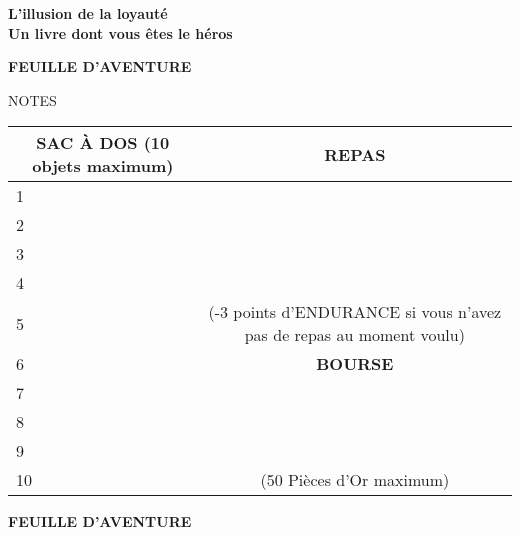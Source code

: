 \documentclass[10pt]{book}
\begin{document}
\frontmatter

\begin{titlepage}
    \begin{center}
        \textbf{\huge L'illusion de la loyauté}\\[0.5cm]
        \textbf{\large Un livre dont vous êtes le héros}\\[2cm]
    \end{center}
\end{titlepage}

\newpage

\begin{center}
  \textbf{FEUILLE D'AVENTURE}
\end{center}
NOTES
\vspace{5.7cm}

{
  \renewcommand\arraystretch{1.8}
  \begin{tabular}{|ll|c|}
    \hline
    \multicolumn{2}{|c|}{\textbf{SAC À DOS} {\scriptsize(10 objets maximum)}}& \textbf{REPAS}\\ \hline
    1& & \\ \cline{1-2}
    2& & \\ \cline{1-2}
    3& & \\ \cline{1-2}
    4& & \\ \cline{1-2}
    5& & \multirow{-2}{3.6cm}{\scriptsize(-3 points d'ENDURANCE si vous n'avez pas de repas au moment voulu)}\\ \hline
    6& & \textbf{BOURSE}\\ \hline
    7& & \\ \cline{1-2}
    8& & \\ \cline{1-2}
    9& & \\ \cline{1-2}
    10& & \multirow{-1}{3.6cm}{\scriptsize(50 Pièces d'Or maximum)}\\ \hline
  \end{tabular}
}

\begin{center}
  \textbf{FEUILLE D'AVENTURE}
\end{center}

\hspace{0.4cm}
\end{document}
